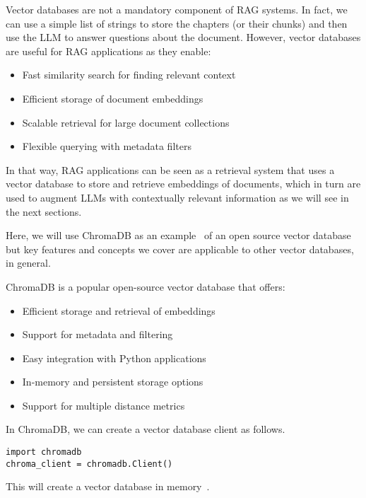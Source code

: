 Vector databases are not a mandatory component of RAG systems. In fact, we can use a simple list of strings to store the chapters (or their chunks) and then use the LLM to answer questions about the document. However, vector databases are useful for RAG applications as they enable:
\begin{itemize}
    \item Fast similarity search for finding relevant context
    \item Efficient storage of document embeddings
    \item Scalable retrieval for large document collections
    \item Flexible querying with metadata filters
\end{itemize}

In that way, RAG applications can be seen as a retrieval system that uses a vector database to store and retrieve embeddings of documents, which in turn are used to augment LLMs with contextually relevant information as we will see in the next sections.

Here, we will use ChromaDB  as an example~ of an open source vector database but key features and concepts we cover are applicable to other vector databases, in general.

ChromaDB is a popular open-source vector database that offers:
\begin{itemize}
    \item Efficient storage and retrieval of embeddings
    \item Support for metadata and filtering
    \item Easy integration with Python applications
    \item In-memory and persistent storage options
    \item Support for multiple distance metrics
\end{itemize}

In ChromaDB, we can create a vector database client as follows.

\begin{verbatim}
import chromadb
chroma_client = chromadb.Client()
\end{verbatim}

This will create a vector database in memory~.


